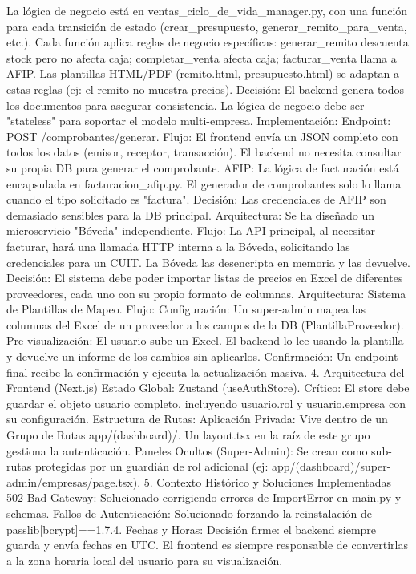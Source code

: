 La lógica de negocio está en ventas_ciclo_de_vida_manager.py, con una función para cada transición de estado (crear_presupuesto, generar_remito_para_venta, etc.).
Cada función aplica reglas de negocio específicas: generar_remito descuenta stock pero no afecta caja; completar_venta afecta caja; facturar_venta llama a AFIP.
Las plantillas HTML/PDF (remito.html, presupuesto.html) se adaptan a estas reglas (ej: el remito no muestra precios).
Decisión: El backend genera todos los documentos para asegurar consistencia. La lógica de negocio debe ser "stateless" para soportar el modelo multi-empresa.
Implementación:
Endpoint: POST /comprobantes/generar.
Flujo: El frontend envía un JSON completo con todos los datos (emisor, receptor, transacción). El backend no necesita consultar su propia DB para generar el comprobante.
AFIP: La lógica de facturación está encapsulada en facturacion_afip.py. El generador de comprobantes solo lo llama cuando el tipo solicitado es "factura".
Decisión: Las credenciales de AFIP son demasiado sensibles para la DB principal.
Arquitectura: Se ha diseñado un microservicio "Bóveda" independiente.
Flujo: La API principal, al necesitar facturar, hará una llamada HTTP interna a la Bóveda, solicitando las credenciales para un CUIT. La Bóveda las desencripta en memoria y las devuelve.
Decisión: El sistema debe poder importar listas de precios en Excel de diferentes proveedores, cada uno con su propio formato de columnas.
Arquitectura: Sistema de Plantillas de Mapeo.
Flujo:
Configuración: Un super-admin mapea las columnas del Excel de un proveedor a los campos de la DB (PlantillaProveedor).
Pre-visualización: El usuario sube un Excel. El backend lo lee usando la plantilla y devuelve un informe de los cambios sin aplicarlos.
Confirmación: Un endpoint final recibe la confirmación y ejecuta la actualización masiva.
4. Arquitectura del Frontend (Next.js)
Estado Global: Zustand (useAuthStore). Crítico: El store debe guardar el objeto usuario completo, incluyendo usuario.rol y usuario.empresa con su configuración.
Estructura de Rutas:
Aplicación Privada: Vive dentro de un Grupo de Rutas app/(dashboard)/. Un layout.tsx en la raíz de este grupo gestiona la autenticación.
Paneles Ocultos (Super-Admin): Se crean como sub-rutas protegidas por un guardián de rol adicional (ej: app/(dashboard)/super-admin/empresas/page.tsx).
5. Contexto Histórico y Soluciones Implementadas
502 Bad Gateway: Solucionado corrigiendo errores de ImportError en main.py y schemas.
Fallos de Autenticación: Solucionado forzando la reinstalación de passlib[bcrypt]==1.7.4.
Fechas y Horas: Decisión firme: el backend siempre guarda y envía fechas en UTC. El frontend es siempre responsable de convertirlas a la zona horaria local del usuario para su visualización.
